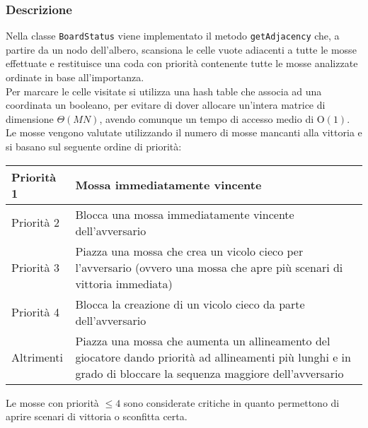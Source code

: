 \documentclass[11pt]{article}
\begin{document}
\subsubsection*{Descrizione}
Nella classe \texttt{BoardStatus} viene implementato il metodo \texttt{getAdjacency} che, a partire da un nodo dell'albero, scansiona le celle vuote adiacenti a tutte le mosse effettuate e restituisce una coda con priorità contenente tutte le mosse analizzate ordinate in base all'importanza.\\
Per marcare le celle visitate si utilizza una hash table che associa ad una coordinata un booleano, per evitare di dover allocare un'intera matrice di dimensione $\Theta(MN)$, avendo comunque un tempo di accesso medio di O$(1)$.\\
Le mosse vengono valutate utilizzando il numero di mosse mancanti alla vittoria e si basano sul seguente ordine di priorità:
\begin{table}[H]	%
\centering			%
\def\arraystretch{1.5}
\begin{tabular}{|l|p{4in}|}	%
\hline	%
Priorità 1 & Mossa immediatamente vincente \\ \hline
Priorità 2 & Blocca una mossa immediatamente vincente dell'avversario \\ \hline
Priorità 3 & Piazza una mossa che crea un vicolo cieco per l'avversario (ovvero una mossa che apre più scenari di vittoria immediata) \\ \hline
Priorità 4 & Blocca la creazione di un vicolo cieco da parte dell'avversario \\ \hline
Altrimenti & Piazza una mossa che aumenta un allineamento del giocatore dando priorità ad allineamenti più lunghi e in grado di bloccare la sequenza maggiore dell'avversario \\ \hline
\end{tabular}
\end{table}
\vspace{-0.7cm}
$ $\\
Le mosse con priorità $\leq 4$ sono considerate critiche in quanto permettono di aprire scenari di vittoria o sconfitta certa.
\end{document}
